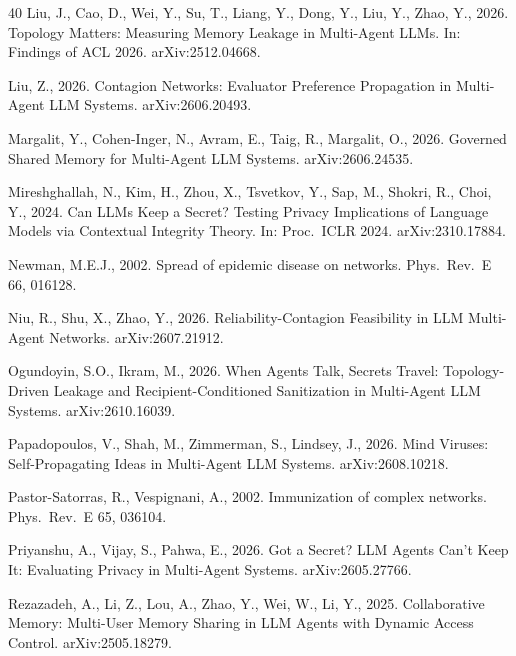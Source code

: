 \documentclass[preprint,12pt,authoryear]{elsarticle}
\begin{document}
\begin{thebibliography}{40}
Liu, J., Cao, D., Wei, Y., Su, T., Liang, Y., Dong, Y., Liu, Y., Zhao, Y., 2026. Topology Matters: Measuring Memory Leakage in Multi-Agent LLMs. In: Findings of ACL 2026. arXiv:2512.04668.

Liu, Z., 2026. Contagion Networks: Evaluator Preference Propagation in Multi-Agent LLM Systems. arXiv:2606.20493.

Margalit, Y., Cohen-Inger, N., Avram, E., Taig, R., Margalit, O., 2026. Governed Shared Memory for Multi-Agent LLM Systems. arXiv:2606.24535.

Mireshghallah, N., Kim, H., Zhou, X., Tsvetkov, Y., Sap, M., Shokri, R., Choi, Y., 2024. Can LLMs Keep a Secret? Testing Privacy Implications of Language Models via Contextual Integrity Theory. In: Proc.\ ICLR 2024. arXiv:2310.17884.

Newman, M.E.J., 2002. Spread of epidemic disease on networks. Phys.\ Rev.\ E 66, 016128.

Niu, R., Shu, X., Zhao, Y., 2026. Reliability-Contagion Feasibility in LLM Multi-Agent Networks. arXiv:2607.21912.

Ogundoyin, S.O., Ikram, M., 2026. When Agents Talk, Secrets Travel: Topology-Driven Leakage and Recipient-Conditioned Sanitization in Multi-Agent LLM Systems. arXiv:2610.16039.

Papadopoulos, V., Shah, M., Zimmerman, S., Lindsey, J., 2026. Mind Viruses: Self-Propagating Ideas in Multi-Agent LLM Systems. arXiv:2608.10218.

Pastor-Satorras, R., Vespignani, A., 2002. Immunization of complex networks. Phys.\ Rev.\ E 65, 036104.

Priyanshu, A., Vijay, S., Pahwa, E., 2026. Got a Secret? LLM Agents Can't Keep It: Evaluating Privacy in Multi-Agent Systems. arXiv:2605.27766.

Rezazadeh, A., Li, Z., Lou, A., Zhao, Y., Wei, W., Li, Y., 2025. Collaborative Memory: Multi-User Memory Sharing in LLM Agents with Dynamic Access Control. arXiv:2505.18279.


\end{thebibliography}
\end{document}
